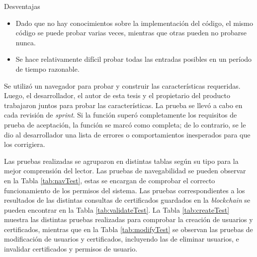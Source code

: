 Desventajas

\begin{itemize}
\item Dado que no hay conocimientos sobre la implementación del código, el mismo código se puede probar varias veces, mientras que otras pueden no probarse nunca.
\item Se hace relativamente difícil probar todas las entradas posibles en un período de tiempo razonable.
\end{itemize}

Se utilizó un navegador para probar y construir las características requeridas. Luego, el desarrollador, el autor de esta tesis y el propietario del producto trabajaron juntos para probar las características. La prueba se llevó a cabo en cada revisión de \textit{sprint}. Si la función superó completamente los requisitos de prueba de aceptación, la función se marcó como completa; de lo contrario, se le dio al desarrollador una lista de errores o comportamientos inesperados para que los corrigiera.

Las pruebas realizadas se agruparon en distintas tablas según su tipo para la mejor comprensión del lector. Las pruebas de navegabilidad se pueden observar en la Tabla \ref{tab:navTest}, estas se encargan de comprobar el correcto funcionamiento de los permisos del sistema. Las pruebas correspondientes a los resultados de las distintas consultas de certificados guardados en la \textit{blockchain} se pueden encontrar en la Tabla \ref{tab:validateTest}. La Tabla \ref{tab:createTest} muestra las distintas pruebas realizadas para comprobar la creación de usuarios y certificados, mientras que en la Tabla \ref{tab:modifyTest} se observan las pruebas de modificación de usuarios y certificados, incluyendo las de eliminar usuarios, e invalidar certificados y permisos de usuario.


